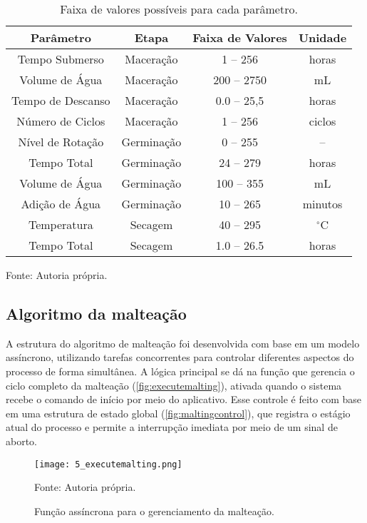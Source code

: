 \begin{table}[ht]
    \caption{Faixa de valores possíveis para cada parâmetro.}
    \label{tab:parametros}
    \centering
    \begin{tabular}{cccc}
        \hline
        \bfseries Parâmetro & \bfseries Etapa & \bfseries Faixa de Valores & \bfseries Unidade \\
        \hline
        Tempo Submerso & Maceração & 1 -- 256  & horas \\
        Volume de Água & Maceração & 200 -- 2750 & mL \\
        Tempo de Descanso & Maceração & 0.0 -- 25,5 & horas \\
        Número de Ciclos & Maceração & 1 -- 256 & ciclos \\
        Nível de Rotação & Germinação & 0 -- 255 & -- \\
        Tempo Total & Germinação & 24 -- 279 & horas \\
        Volume de Água & Germinação & 100 -- 355 & mL \\
        Adição de Água & Germinação & 10 -- 265 & minutos \\
        Temperatura & Secagem & 40 -- 295 & $^{\circ}$C \\
        Tempo Total & Secagem & 1.0 -- 26.5 & horas \\
        \hline
    \end{tabular}

    {\centering\footnotesize Fonte: Autoria própria.\par}
\end{table}



\subsection{Algoritmo da malteação}

A estrutura do algoritmo de malteação foi desenvolvida com base em um modelo assíncrono, utilizando tarefas concorrentes para controlar diferentes aspectos do processo de forma simultânea. A lógica principal se dá na função que gerencia o ciclo completo da malteação (\autoref{fig:executemalting}), ativada quando o sistema recebe o comando de início por meio do aplicativo. Esse controle é feito com base em uma estrutura de estado global (\autoref{fig:maltingcontrol}), que registra o estágio atual do processo e permite a interrupção imediata por meio de um sinal de aborto.

\begin{figure}[ht]
    \centering
    \caption{Função assíncrona para o gerenciamento da malteação.}
    \label{fig:executemalting}
    \texttt{[image: 5\_executemalting.png]}

    {\centering\footnotesize Fonte: Autoria própria.\par}
\end{figure}

